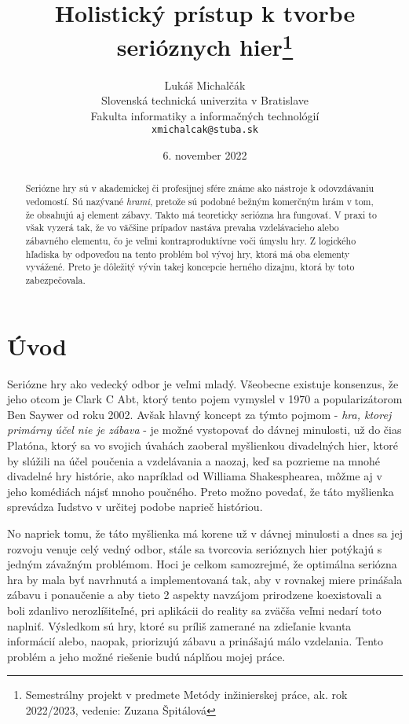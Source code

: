 \documentclass[10pt,twoside,slovak,a4paper]{article}
\title{Holistický prístup k tvorbe serióznych hier\thanks{Semestrálny projekt v predmete Metódy inžinierskej práce, ak. rok 2022/2023, vedenie: Zuzana Špitálová}}
\author{Lukáš Michalčák\\[2pt]
	{\small Slovenská technická univerzita v Bratislave}\\
	{\small Fakulta informatiky a informačných technológií}\\
	{\small \texttt{xmichalcak@stuba.sk}}
	}
\date{\small 6. november 2022}
\begin{document}
\maketitle

\begin{abstract}
Seriózne hry sú v akademickej či profesijnej sfére známe ako nástroje k odovzdávaniu vedomostí. Sú nazývané \emph{hrami}, pretože sú podobné bežným komerčným hrám v tom, že obsahujú aj element zábavy. Takto má teoreticky seriózna hra fungovať. V praxi to však vyzerá tak, že vo väčšine prípadov nastáva prevaha vzdelávacieho alebo zábavného elementu, čo je veľmi kontraproduktívne voči úmyslu hry. Z logického hľadiska by odpoveďou na tento problém bol vývoj hry, ktorá má oba elementy vyvážené. Preto je dôležitý vývin takej koncepcie herného dizajnu, ktorá by toto zabezpečovala.
\end{abstract}



\section{Úvod}

Seriózne hry ako vedecký odbor je veľmi mladý. Všeobecne existuje konsenzus, že jeho otcom je Clark C Abt, ktorý tento pojem vymyslel v 1970 a popularizátorom Ben Saywer od roku 2002. \cite{wilkinson2016brief} Avšak hlavný koncept za týmto pojmom - \emph{hra, ktorej primárny účel nie je zábava} \cite{alvarez2011introduction} - je možné vystopovať do dávnej minulosti, už do čias Platóna, ktorý sa vo svojich úvahách zaoberal myšlienkou divadelných hier, ktoré by slúžili na účel poučenia a vzdelávania a naozaj, keď sa pozrieme na mnohé divadelné hry histórie, ako napríklad od Williama Shakesphearea, môžme aj v jeho komédiách nájsť mnoho poučného. Preto možno povedať, že táto myšlienka sprevádza ľudstvo v určitej podobe naprieč históriou. 

No napriek tomu, že táto myšlienka má korene už v dávnej minulosti a dnes sa jej rozvoju venuje celý vedný odbor, stále sa tvorcovia serióznych hier potýkajú s jedným závažným problémom. Hoci je celkom samozrejmé, že optimálna seriózna hra by mala byť navrhnutá a implementovaná tak, aby v rovnakej miere prinášala zábavu i ponaučenie a aby tieto 2 aspekty navzájom prirodzene koexistovali a boli zdanlivo nerozlíšiteľné, pri aplikácii do reality sa zväčša veľmi nedarí toto naplniť. Výsledkom sú hry, ktoré su príliš zamerané na zdieľanie kvanta informácií alebo, naopak, priorizujú zábavu a prinášajú málo vzdelania. Tento problém a jeho možné riešenie budú náplňou mojej práce.
\end{document}
